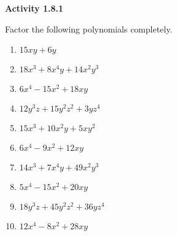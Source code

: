 \vspace{1ex}
\noindent\textbf{Activity 1.8.1}

\vspace{0.75ex}

Factor the following polynomials completely.  
\begin{multicols}{2}
\begin{enumerate}
\item $15xy + 6y$
\item $18x^{3} + 8x^{4}y + 14x^{2}y^{3}$
\item $6x^{4} - 15x^{2} + 18xy$
\item $12y^{3}z + 15y^{2}z^{2} + 3yz^{4}$
\item $15x^{3} + 10x^{2}y + 5xy^{2}$
\item $6x^{4} - 9x^{2} + 12xy$
\item $14x^{3} + 7x^{4}y + 49x^{2}y^{3}$
\item $5x^{4} - 15x^{2} + 20xy$
\item $18y^{3}z + 45y^{2}z^{2} + 36yz^{4}$
\item $12 x^{4} - 8 x^{2} + 28 x y$
\end{enumerate}
\end{multicols} 